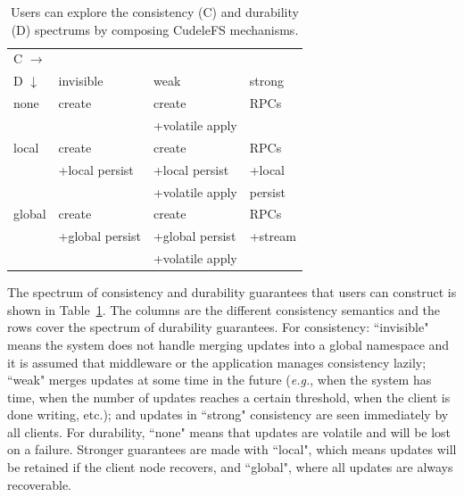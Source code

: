 \begin{table}[t]
\begin{center}
\begin{tabular}{ l | l | l | l }
  C \(\rightarrow\) &&& \\  
  D \(\downarrow\)  	     & invisible         & weak        & strong  \\\hline
  none                       & create            & create          & RPCs    \\
                             &                   & +volatile apply &         \\\hdashline
  local                      & create            & create          & RPCs    \\
                             & +local persist    & +local persist  & +local  \\
                             &                   & +volatile apply &  persist\\\hdashline
  global                     & create            & create          & RPCs    \\
                             & +global persist   & +global persist & +stream \\
                             &                   & +volatile apply &         \\
\end{tabular}

\caption{Users can explore the consistency (C) and
durability (D) spectrums by composing CudeleFS mechanisms. 
\label{table:spectrum}}
\end{center}
\end{table}



The spectrum of consistency and durability guarantees that users can
construct is shown in Table~\ref{table:spectrum}. The columns are the different
consistency semantics and the rows cover the spectrum of durability guarantees.
For consistency: ``invisible" means the system does not handle merging updates
into a global namespace and it is assumed that middleware or the application
manages consistency lazily; ``weak" merges updates at some time in the
future ({\it e.g.}, when the system has time, when the number of updates reaches a
certain threshold, when the client is done writing, etc.); and updates in
``strong" consistency are seen immediately by all clients. For durability,
``none" means that updates are volatile and will be lost on a failure. Stronger
guarantees are made with ``local", which means updates will be retained if the
client node recovers, and ``global", where all updates are always recoverable.

